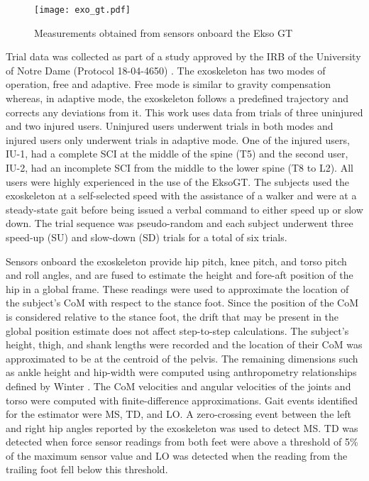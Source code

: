 \begin{figure}
	\centering
	\texttt{[image: exo\_gt.pdf]}
	\vspace{-1em}
	\caption{Measurements obtained from sensors onboard the Ekso GT \cite{eksoOperator}}\label{fig:exoOperator}
	\vspace{-1em}
\end{figure}

Trial data was collected as part of a study approved by the IRB of the University of Notre Dame (Protocol 18-04-4650) \cite{gambon2020effects}. The exoskeleton has two modes of operation, free and adaptive. Free mode is similar to gravity compensation whereas, in adaptive mode, the exoskeleton follows a predefined trajectory and corrects any deviations from it. This work uses data from trials of three uninjured and two injured users. Uninjured users underwent trials in both modes and injured users only underwent trials in adaptive mode. One of the injured users, IU-1, had a complete SCI at the middle of the spine (T5) and the second user, IU-2, had an incomplete SCI from the middle to the lower spine (T8 to L2). All users were highly experienced in the use of the EksoGT. The subjects used the exoskeleton at a self-selected speed with the assistance of a walker and were at a steady-state gait before being issued a verbal command to either speed up or slow down. The trial sequence was pseudo-random and each subject underwent three speed-up (SU) and slow-down (SD) trials for a total of six trials.

Sensors onboard the exoskeleton provide hip pitch, knee pitch, and torso pitch and roll angles, and are fused to estimate the height and fore-aft position of the hip in a global frame. These readings were used to approximate the location of the subject's CoM with respect to the stance foot. Since the position of the CoM is considered relative to the stance foot, the drift that may be present in the global position estimate does not affect step-to-step calculations. The subject's height, thigh, and shank lengths were recorded and the location of their CoM was approximated to be at the centroid of the pelvis. The remaining dimensions such as ankle height and hip-width were computed using anthropometry relationships defined by Winter \cite{winter2009biomechanics}. The CoM velocities and angular velocities of the joints and torso were computed with finite-difference approximations. Gait events identified for the estimator were MS, TD, and LO. A zero-crossing event between the left and right hip angles reported by the exoskeleton was used to detect MS. TD was detected when force sensor readings from both feet were above a threshold of 5\% of the maximum sensor value and LO was detected when the reading from the trailing foot fell below this threshold. 

